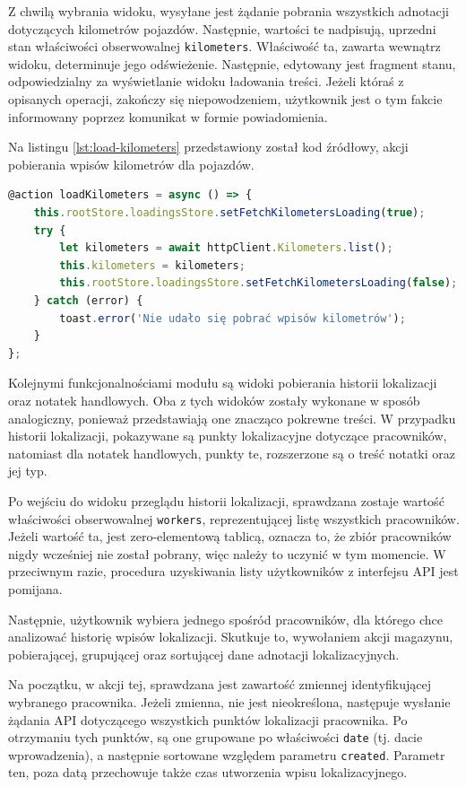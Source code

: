 Z chwilą wybrania widoku, wysyłane jest żądanie pobrania wszystkich adnotacji dotyczących kilometrów pojazdów. Następnie, wartości te nadpisują, uprzedni stan właściwości obserwowalnej \texttt{kilometers}. Właściwość ta, zawarta wewnątrz widoku, determinuje jego odświeżenie. Następnie, edytowany jest fragment stanu, odpowiedzialny za wyświetlanie widoku ładowania treści. Jeżeli któraś z opisanych operacji, zakończy się niepowodzeniem, użytkownik jest o tym fakcie informowany poprzez komunikat w formie powiadomienia.

Na listingu \ref{lst:load-kilometers} przedstawiony został kod źródłowy, akcji pobierania wpisów kilometrów dla pojazdów. 

\begin{lstlisting}[label=lst:load-kilometers,caption=Kod akcji pobierającej listę kilometrów dla pojazdów, captionpos=b,basicstyle=\footnotesize\ttfamily,language=JavaScript]
@action loadKilometers = async () => {
	this.rootStore.loadingsStore.setFetchKilometersLoading(true);
	try {
		let kilometers = await httpClient.Kilometers.list();
		this.kilometers = kilometers;
		this.rootStore.loadingsStore.setFetchKilometersLoading(false);
	} catch (error) {
		toast.error('Nie udało się pobrać wpisów kilometrów');
	}
};
\end{lstlisting}

Kolejnymi funkcjonalnościami modułu są widoki pobierania historii lokalizacji oraz notatek handlowych. Oba z tych widoków zostały wykonane w sposób analogiczny, ponieważ przedstawiają one znacząco pokrewne treści. W przypadku historii lokalizacji, pokazywane są punkty lokalizacyjne dotyczące pracowników, natomiast dla notatek handlowych, punkty te, rozszerzone są o treść notatki oraz jej typ.

Po wejściu do widoku przeglądu historii lokalizacji, sprawdzana zostaje wartość właściwości obserwowalnej \texttt{workers}, reprezentującej listę wszystkich pracowników. Jeżeli wartość ta, jest zero-elementową tablicą, oznacza to, że zbiór pracowników nigdy wcześniej nie został pobrany, więc należy to uczynić w tym momencie. W przeciwnym razie, procedura uzyskiwania listy użytkowników z interfejsu API jest pomijana.

Następnie, użytkownik wybiera jednego spośród pracowników, dla którego chce analizować historię wpisów lokalizacji. Skutkuje to, wywołaniem akcji magazynu, pobierającej, grupującej oraz sortującej dane adnotacji lokalizacyjnych.

Na początku, w akcji tej, sprawdzana jest zawartość zmiennej identyfikującej wybranego pracownika. Jeżeli zmienna, nie jest nieokreślona, następuje wysłanie żądania API dotyczącego wszystkich punktów lokalizacji pracownika. Po otrzymaniu tych punktów, są one grupowane po właściwości \texttt{date} (tj. dacie wprowadzenia), a następnie sortowane względem parametru \texttt{created}. Parametr ten, poza datą przechowuje także czas utworzenia wpisu lokalizacyjnego.

